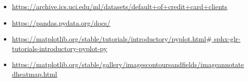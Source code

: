\documentclass[12pt]{report}
\renewcommand{\_}{\kern-1.5pt\textunderscore\kern-1.5pt}
\begin{document}
\vspace{\baselineskip}
\begin{itemize}
	\item \href{https://archive.ics.uci.edu/ml/datasets/default+of+credit+card+clients#}{\textcolor[HTML]{1155CC}{\ul{https://archive.ics.uci.edu/ml/datasets/default+of+credit+card+clients}}}
	\item \href{https://pandas.pydata.org/docs/}{\textcolor[HTML]{1155CC}{\ul{https://pandas.pydata.org/docs/}}}
	\item \href{https://matplotlib.org/stable/tutorials/introductory/pyplot.html#sphx-glr-tutorials-introductory-pyplot-py}{\textcolor[HTML]{1155CC}{\ul{https://matplotlib.org/stable/tutorials/introductory/pyplot.html$\#$ sphx-glr-tutorials-introductory-pyplot-py}}}
	\item \href{https://matplotlib.org/stable/gallery/images_contours_and_fields/image_annotated_heatmap.html}{\textcolor[HTML]{1155CC}{\ul{https://matplotlib.org/stable/gallery/images\_contours\_and\_fields/image\_annotated\_heatmap.html}}}


\end{itemize}
\end{document}
